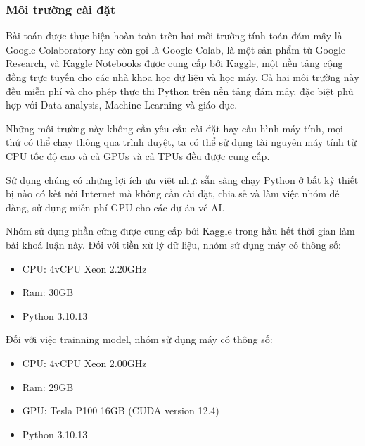 \subsubsection{Môi trường cài đặt}
Bài toán được thực hiện hoàn toàn trên hai môi trường tính toán đám mây là Google Colaboratory hay còn gọi là Google Colab, là một sản phẩm từ Google Research, và Kaggle Notebooks được cung cấp bởi Kaggle, một nền tảng cộng đồng trực tuyến cho các nhà khoa học dữ liệu và học máy. Cả hai môi trường này đều miễn phí và cho phép thực thi Python trên nền tảng đám mây, đặc biệt phù hợp với Data analysis, Machine Learning và giáo dục.

Những môi trường này không cần yêu cầu cài đặt hay cấu hình máy tính, mọi thứ có thể chạy thông qua trình duyệt, ta có thể sử dụng tài nguyên máy tính từ CPU tốc độ cao và cả GPUs và cả TPUs đều được cung cấp.

Sử dụng chúng có những lợi ích ưu việt như: sẵn sàng chạy Python ở bất kỳ thiết bị nào có kết nối Internet mà không cần cài đặt, chia sẻ và làm việc nhóm dễ dàng, sử dụng miễn phí GPU cho các dự án về AI\cite{webpage15}.

Nhóm sử dụng phần cứng được cung cấp bởi Kaggle trong hầu hết thời gian làm bài khoá luận này. Đối với tiền xử lý dữ liệu, nhóm sử dụng máy có thông số:
\begin{itemize}
    \item CPU: 4vCPU Xeon 2.20GHz
    \item Ram: 30GB
    \item Python 3.10.13
\end{itemize}
Đối với việc trainning model, nhóm sử dụng máy có thông số:
\begin{itemize}
    \item CPU: 4vCPU Xeon 2.00GHz
    \item Ram: 29GB
    \item GPU: Tesla P100 16GB (CUDA version 12.4)
    \item Python 3.10.13
\end{itemize}

